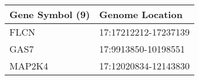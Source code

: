 \begin{tabular}{ll}
\toprule
Gene Symbol (9) &      Genome Location \\
\midrule
           FLCN & 17:17212212-17237139 \\
           GAS7 &  17:9913850-10198551 \\
         MAP2K4 & 17:12020834-12143830 \\
\bottomrule
\end{tabular}
